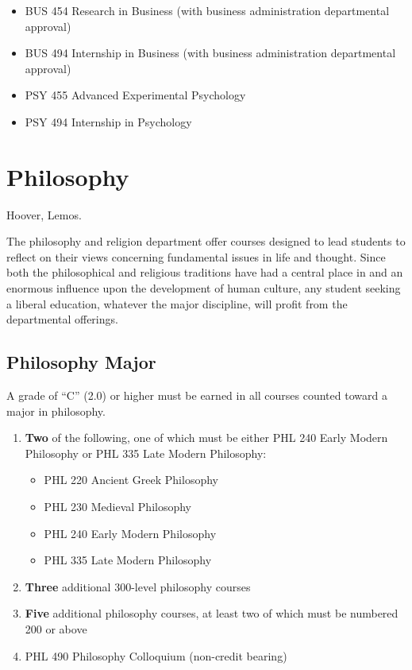 \documentclass[
  letterpaper,
]{scrbook}
\providecommand{\tightlist}{%
  \setlength{\itemsep}{0pt}\setlength{\parskip}{0pt}}
\begin{document}
\begin{enumerate}
  \begin{itemize}
  \tightlist
  \item
    BUS 454 Research in Business (with business administration
    departmental approval)
  \item
    BUS 494 Internship in Business (with business administration
    departmental approval)
  \item
    PSY 455 Advanced Experimental Psychology
  \item
    PSY 494 Internship in Psychology
  \end{itemize}
\end{enumerate}

\section{Philosophy}\label{philosophy}

Hoover, Lemos.

The philosophy and religion department offer courses designed to lead
students to reflect on their views concerning fundamental issues in life
and thought. Since both the philosophical and religious traditions have
had a central place in and an enormous influence upon the development of
human culture, any student seeking a liberal education, whatever the
major discipline, will profit from the departmental offerings.

\subsection{Philosophy Major}\label{philosophy-major}

A grade of ``C'' (2.0) or higher must be earned in all courses counted
toward a major in philosophy.

\begin{enumerate}
\def\labelenumi{\arabic{enumi}.}
\item
  \textbf{Two} of the following, one of which must be either PHL 240
  Early Modern Philosophy or PHL 335 Late Modern Philosophy:

  \begin{itemize}
  \tightlist
  \item
    PHL 220 Ancient Greek Philosophy
  \item
    PHL 230 Medieval Philosophy
  \item
    PHL 240 Early Modern Philosophy
  \item
    PHL 335 Late Modern Philosophy
  \end{itemize}
\item
  \textbf{Three} additional 300-level philosophy courses
\item
  \textbf{Five} additional philosophy courses, at least two of which
  must be numbered 200 or above
\item
  PHL 490 Philosophy Colloquium (non-credit bearing)
\end{enumerate}
\end{document}
